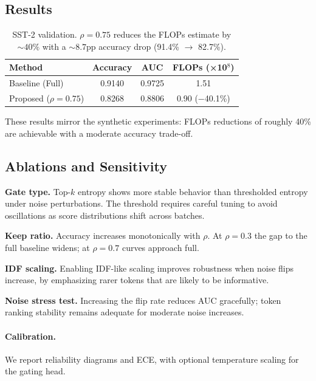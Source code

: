 \documentclass{article}
\begin{document}
\subsection{Results}
\begin{table}[htbp]
\centering
\setlength{\tabcolsep}{4pt}            %
\renewcommand{\arraystretch}{0.95}     %
\footnotesize                          %
\begin{tabular}{@{}lccc@{}}            %
\toprule
Method & Accuracy & AUC & FLOPs (×10$^{8}$) \\
\midrule
Baseline (Full)         & 0.9140 & 0.9725 & 1.51 \\
Proposed ($\rho{=}0.75$) & 0.8268 & 0.8806 & 0.90 (−40.1\%) \\
\bottomrule
\end{tabular}
\caption{SST-2 validation. $\rho{=}0.75$ reduces the FLOPs estimate by ${\sim}40\%$ with a ${\sim}8.7$pp accuracy drop (91.4\% $\rightarrow$ 82.7\%).}
\end{table}


These results mirror the synthetic experiments: FLOPs reductions of roughly 40\% are achievable with a moderate accuracy trade-off.

\subsection{Ablations and Sensitivity}
\label{sec:ablations}
\textbf{Gate type.} Top-$k$ entropy shows more stable behavior than thresholded entropy under noise perturbations. The threshold requires careful tuning to avoid oscillations as score distributions shift across batches.

\textbf{Keep ratio.} Accuracy increases monotonically with $\rho$. At $\rho{=}0.3$ the gap to the full baseline widens; at $\rho{=}0.7$ curves approach full.

\textbf{IDF scaling.} Enabling IDF-like scaling improves robustness when noise flips increase, by emphasizing rarer tokens that are likely to be informative.

\textbf{Noise stress test.} Increasing the flip rate reduces AUC gracefully; token ranking stability remains adequate for moderate noise increases.

\paragraph{Calibration.}
We report reliability diagrams and ECE, with optional temperature scaling for the gating head.
\end{document}

